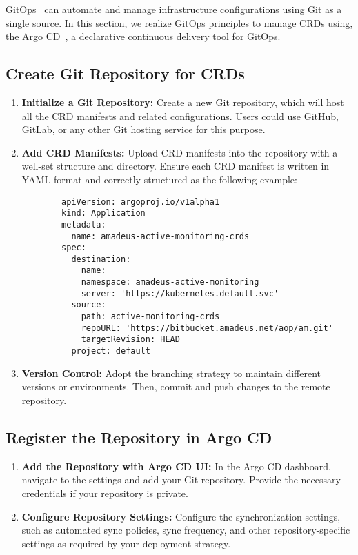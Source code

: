 GitOps~\parencite{WeaveworksWeavegitopsWeave} can automate and manage infrastructure configurations using Git as a single source. In this section, we realize GitOps principles to manage \ac{CRD}s using, the Argo CD~\parencite{ArgoCDDeclarative}, a declarative continuous delivery tool for GitOps. 

\subsection{Create Git Repository for CRDs}

\begin{enumerate}
    \item \textbf{Initialize a Git Repository:} Create a new Git repository, which will host all the \ac{CRD} manifests and related configurations. Users could use GitHub, GitLab, or any other Git hosting service for this purpose.
    \item \textbf{Add \ac{CRD} Manifests:} Upload \ac{CRD} manifests into the repository with a well-set structure and directory. Ensure each \ac{CRD} manifest is written in YAML format and correctly structured as the following example: 
      \begin{lstlisting}
        apiVersion: argoproj.io/v1alpha1
        kind: Application
        metadata:
          name: amadeus-active-monitoring-crds
        spec:
          destination:
            name: 
            namespace: amadeus-active-monitoring
            server: 'https://kubernetes.default.svc'
          source:
            path: active-monitoring-crds
            repoURL: 'https://bitbucket.amadeus.net/aop/am.git'
            targetRevision: HEAD
          project: default
      \end{lstlisting}
    \item \textbf{Version Control:} Adopt the branching strategy to maintain different versions or environments. Then, commit and push changes to the remote repository. 
\end{enumerate}

\subsection{Register the Repository in Argo CD}

\begin{enumerate}
    \item \textbf{Add the Repository with Argo CD UI:} In the Argo CD dashboard, navigate to the settings and add your Git repository. Provide the necessary credentials if your repository is private. 
    \item \textbf{Configure Repository Settings:} Configure the synchronization settings, such as automated sync policies, sync frequency, and other repository-specific settings as required by your deployment strategy. 
\end{enumerate}

